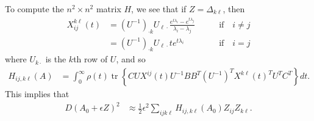\documentclass{article}
\newcommand{\tr}{\mathop{\mbox{tr}}} %
\newcommand{\1}{\mathbbm{1}}
\begin{document}
To compute the $n^2 \times n^2$ matrix $H$,
we see that if $Z=\Delta_{k \ell}$, then
\begin{equation}
  \begin{aligned}
      X_{ij}^{k\ell}(t) 
      &= 
      (U^{-1})_{\cdot k} U_{\ell \cdot}
      \frac{ e^{t \lambda_i} - e^{t \lambda_j} }{ \lambda_i - \lambda_j } 
          \qquad & \text{if} \quad i \neq j \\
      &=
      (U^{-1})_{\cdot k} U_{\ell \cdot}
      t e^{t \lambda_i} 
          \qquad & \text{if} \quad i = j 
  \end{aligned}
\end{equation}
where $U_{k \cdot}$ is the $k$th row of $U$,
and so
\begin{equation}
    \begin{aligned}
        H_{ij, k\ell}(A)
        &=
        \int_0^\infty
            \rho(t) \tr\left\{ C U X^{ij}(t) U^{-1} B B^T (U^{-1})^T X^{k\ell}(t)^T U^T C^T \right\}
        dt .
    \end{aligned}
\end{equation}
This implies that
\begin{equation}
    \begin{aligned}
        D(A_0+\epsilon Z)^2
        &\approx \frac{1}{2} \epsilon^2 \sum_{ijk\ell} H_{ij,k\ell}(A_0) Z_{ij} Z_{k\ell}  .
    \end{aligned}
\end{equation}

\end{document}
